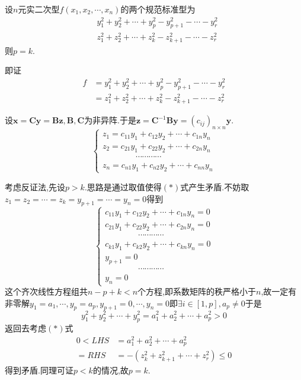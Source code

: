 \begin{formal}
    \begin{theorem}[惯性定理]\label{thm:惯性定理}
        设$n$元实二次型$f\left(
            x_1,x_2,\cdots,x_n
            \right)$的两个规范标准型为\begin{align*}
                &y_1^2+y_2^2+\cdots+y_p^2-y_{p+1}^2-\cdots-y_r^2\\
                &z_1^2+z_2^2+\cdots+z_k^2-z_{k+1}^2-\cdots-z_r^2
            \end{align*}则$p=k.$
    \end{theorem}
    \begin{Proof}
        即证\begin{align*}
            f&=y_1^2+y_2^2+\cdots+y_p^2-y_{p+1}^2-\cdots-y_r^2\\
            &=z_1^2+z_2^2+\cdots+z_k^2-z_{k+1}^2-\cdots-z_r^2\tag{$*$}
        \end{align*}

        设$\bm{x}=\bm{Cy}=\bm{Bz},\bm{B},\bm{C}$为非异阵.于是$\bm{z}=\bm{C}^{-1}\bm{By}=\left(c_{ij}\right)_{n\times n}\bm{y}.$\[
        \begin{cases*}
            z_1=c_{11}y_1+c_{12}y_2+\cdots+c_{1n}y_n\\
            z_2=c_{21}y_1+c_{22}y_2+\cdots+c_{2n}y_n\\
            \qquad\qquad\cdots\cdots\cdots\cdots\\
            z_n=c_{n1}y_1+c_{n2}y_2+\cdots+c_{nn}y_n
        \end{cases*}
        \]

        考虑反证法,先设$p>k$.思路是通过取值使得$\left(*\right)$式产生矛盾.不妨取$z_1=z_2=\cdots=z_k=y_{p+1}=\cdots=y_n=0$得到\[
        \begin{cases*}
            c_{11}y_1+c_{12}y_2+\cdots+c_{1n}y_n=0\\
            c_{21}y_1+c_{22}y_2+\cdots+c_{2n}y_n=0\\
            \qquad\qquad\cdots\cdots\cdots\cdots\\
            c_{k1}y_1+c_{k2}y_2+\cdots+c_{kn}y_n=0\\
            y_{p+1}=0\\
            \qquad\qquad\cdots\cdots\cdots\cdots\\
            y_n=0
        \end{cases*}\tag{$**$}
        \]这个齐次线性方程组共$n-p+k<n$个方程,即系数矩阵的秩严格小于$n$,故一定有非零解$y_1=a_1,\cdots,y_p=a_p,y_{p+1}=0,\cdots,y_n=0$即$\exists i\in\left[1,p\right],a_p\neq 0$于是\[
        y_1^2+y_2^2+\cdots+y_p^2=a_1^2+a_2^2+\cdots+a_p^2>0
        \]返回去考虑$\left(*\right)$式\begin{align*}
      0<      LHS&=a_1^2+a_2^2+\cdots+a_p^2\\
      =RHS&=-\left(
        z_k^2+z_{k+1}^2+\cdots+z_r^2
      \right)\leqslant 0
        \end{align*}得到矛盾.同理可证$p<k$的情况,故$p=k$.
    \end{Proof}
\end{formal}
